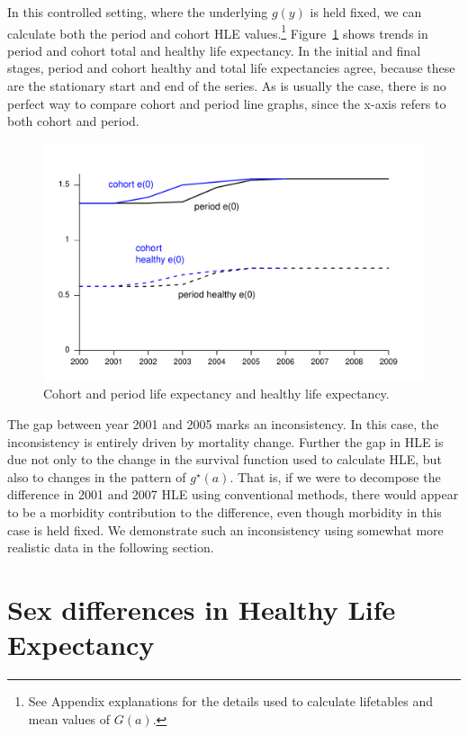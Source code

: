 \documentclass[11pt,oneside,a4paper]{article} %
\begin{document}
In this controlled setting, where the underlying $g(y)$ is held fixed, we can
calculate both the period and cohort HLE values.\footnote{See Appendix
explanations for the details used to calculate lifetables and mean values of
$G(a)$. } Figure~\ref{fig:e0eHtoy} shows trends in period and cohort total and
healthy life expectancy. In the initial and final stages, period and cohort
healthy and total life expectancies agree, because these are the stationary
start and end of the series. As is usually the case, there is no perfect way to
compare cohort and period line graphs, since the x-axis refers to both cohort
and period. 

\begin{figure}
\begin{adjustwidth}{-1.5cm}{}
	\centering
	\includegraphics[scale=.6]{Figures/e0eHtoy.pdf}
	\caption{Cohort and period life expectancy and healthy life expectancy.}
	\label{fig:e0eHtoy}
\end{adjustwidth}
\end{figure}

The gap between year 2001 and 2005 marks an inconsistency. In
this case, the inconsistency is entirely driven by mortality change. Further the
gap in HLE is due not only to the change in the survival function used to
calculate HLE, but also to changes in the pattern of $g^\star(a)$. That is,
if we were to decompose the difference in 2001 and 2007 HLE using conventional
methods, there would appear to be a morbidity contribution to the difference,
even though morbidity in this case is held fixed. We demonstrate such an
inconsistency using somewhat more realistic data in the following section.
 



\section{Sex differences in Healthy Life Expectancy}
\end{document}
